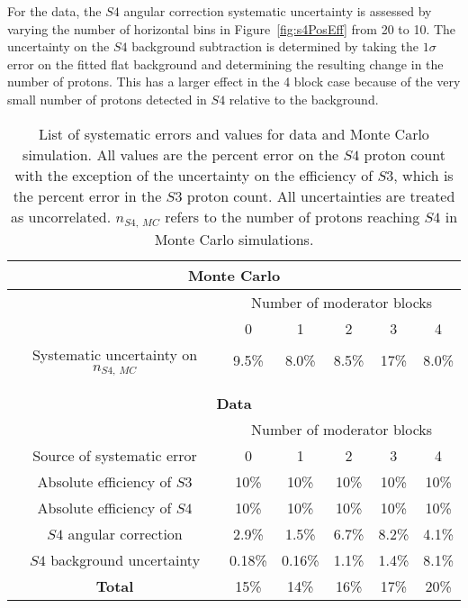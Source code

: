 For the data, the $\mathit{S4}$ angular correction systematic uncertainty is assessed by varying the number of horizontal bins in Figure~\ref{fig:s4PosEff} from 20 to 10.
The uncertainty on the $\mathit{S4}$ background subtraction is determined by taking the $1\sigma$ error on the fitted flat background and determining the resulting change in the number of protons.
This has a larger effect in the 4 block case because of the very small number of protons detected in $\mathit{S4}$ relative to the background.

\begin{table}
  \centering
  \caption{List of systematic errors and values for data and Monte Carlo simulation. All values are the percent error on the $\mathit{S4}$ proton count with the exception of the uncertainty on the efficiency of $\mathit{S3}$, which is the percent error in the $\mathit{S3}$ proton count. All uncertainties are treated as uncorrelated. $n_{\mathit{S4},~MC}$ refers to the number of protons reaching $\mathit{S4}$ in Monte Carlo simulations.}
  \begin{tabular}{c|c c c c c}
    \hline
    \hline
    \multicolumn{6}{c}{\textbf{Monte Carlo}} \\
    \hline
    & \multicolumn{5}{c}{Number of moderator blocks} \\
    & 0 & 1 & 2 & 3 & 4 \\
    \hline
    Systematic uncertainty on $n_{\mathit{S4},~MC}$ & 9.5\% & 8.0\% & 8.5\% & 17\% & 8.0\% \\
    \hline
    \multicolumn{6}{c}{} \\
    \multicolumn{6}{c}{} \\
    \hline
    \hline
    \multicolumn{6}{c}{\textbf{Data}} \\
    \hline
    & \multicolumn{5}{c}{Number of moderator blocks} \\
    Source of systematic error & 0 & 1 & 2 & 3 & 4 \\
    \hline
    Absolute efficiency of $\mathit{S3}$ & 10\% & 10\% & 10\% & 10\% & 10\% \\
    Absolute efficiency of $\mathit{S4}$ & 10\% & 10\% & 10\% & 10\% & 10\% \\ 
    $\mathit{S4}$ angular correction & 2.9\% & 1.5\% & 6.7\% & 8.2\% & 4.1\% \\
    $\mathit{S4}$ background uncertainty & 0.18\% & 0.16\% & 1.1\% & 1.4\% & 8.1\% \\
    \hline
    \textbf{Total} & 15\% & 14\% & 16\% & 17\% & 20\% \\
    \hline 
  \end{tabular}
  \label{tab:systematics}
\end{table}


